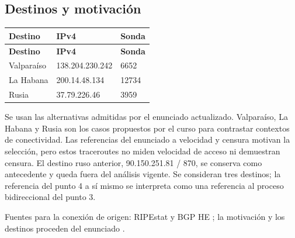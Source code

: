 \subsection{Destinos y motivación}
\begingroup
\fontsize{9}{11}\selectfont
\addtocounter{table}{-1}
\begin{longtable}{p{3cm}p{6cm}p{3cm}}
\toprule
\textbf{Destino} & \textbf{IPv4} & \textbf{Sonda} \\ \midrule
\endfirsthead
\toprule
\textbf{Destino} & \textbf{IPv4} & \textbf{Sonda} \\ \midrule
\endhead
Valparaíso & 138.204.230.242 & 6652 \\
La Habana & 200.14.48.134 & 12734 \\
Rusia & 37.79.226.46 & 3959 \\
\bottomrule
\end{longtable}
\endgroup
Se usan las alternativas admitidas por el enunciado actualizado. Valparaíso, La Habana y Rusia son los casos propuestos por el curso para contrastar contextos de conectividad. Las referencias del enunciado a velocidad y censura motivan la selección, pero estos traceroutes no miden velocidad de acceso ni demuestran censura. El destino ruso anterior, 90.150.251.81 / 870, se conserva como antecedente y queda fuera del análisis vigente. Se consideran tres destinos; la referencia del punto 4 a sí mismo se interpreta como una referencia al proceso bidireccional del punto 3.

\noindent Fuentes para la conexión de origen: RIPEstat \cite{ref4} y BGP HE \cite{ref7}; la motivación y los destinos proceden del enunciado \cite{ref8}.

